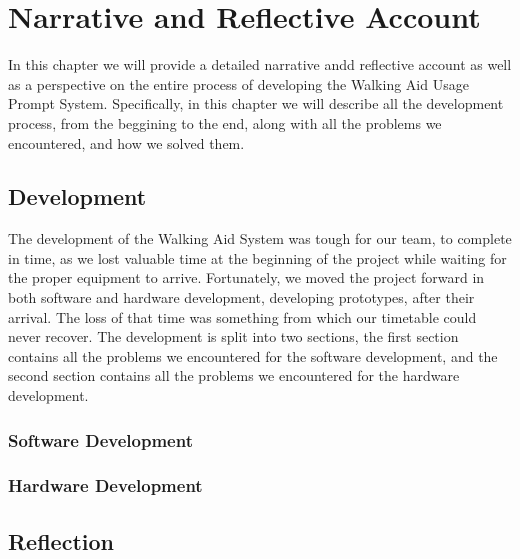\chapter{Narrative and Reflective Account}
\label{ch:narrative}

    In this chapter we will provide a detailed narrative andd reflective account as well as a perspective on the entire process of developing the Walking Aid Usage Prompt System. Specifically, in this chapter we will describe all the development process, from the beggining to the end, along with all the problems we encountered, and how we solved them.

    \section{Development}
    \label{sec:development}

    The development of the Walking Aid System was tough for our team, to complete in time, as we lost valuable time at the beginning of the project while waiting for the proper equipment to arrive. Fortunately, we moved the project forward in both software and hardware development, developing prototypes, after their arrival. The loss of that time was something from which our timetable could never recover. The development is split into two sections, the first section contains all the problems we encountered for the software development, and the second section contains all the problems we encountered for the hardware development.

    \subsection{Software Development}
    \label{sec:software}


    \subsection{Hardware Development}
    \label{sec:hardware}



    \section{Reflection}
    \label{sec:Reflection}
